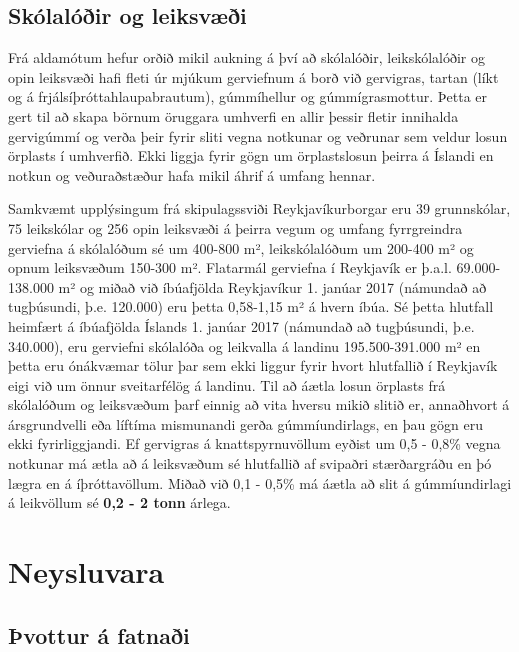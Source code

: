 \documentclass[icelandic,]{book}
\begin{document}
\hypertarget{skolaloir-og-leiksvi}{%
\subsection*{Skólalóðir og leiksvæði}\label{skolaloir-og-leiksvi}}

Frá aldamótum hefur orðið mikil aukning á því að skólalóðir, leikskólalóðir og opin leiksvæði hafi fleti úr mjúkum gerviefnum á borð við gervigras, tartan (líkt og á frjálsíþróttahlaupabrautum), gúmmíhellur og gúmmígrasmottur. Þetta er gert til að skapa börnum öruggara umhverfi en allir þessir fletir innihalda gervigúmmí og verða þeir fyrir sliti vegna notkunar og veðrunar sem veldur losun örplasts í umhverfið. Ekki liggja fyrir gögn um örplastslosun þeirra á Íslandi en notkun og veðuraðstæður hafa mikil áhrif á umfang hennar.

Samkvæmt upplýsingum frá skipulagssviði Reykjavíkurborgar eru 39 grunnskólar, 75 leikskólar og 256 opin leiksvæði á þeirra vegum og umfang fyrrgreindra gerviefna á skólalóðum sé um 400-800 m², leikskólalóðum um 200-400 m² og opnum leiksvæðum 150-300 m². Flatarmál gerviefna í Reykjavík er þ.a.l. 69.000-138.000 m² og miðað við íbúafjölda Reykjavíkur 1. janúar 2017 (námundað að tugþúsundi, þ.e. 120.000) eru þetta 0,58-1,15 m² á hvern íbúa. Sé þetta hlutfall heimfært á íbúafjölda Íslands 1. janúar 2017 (námundað að tugþúsundi, þ.e. 340.000), eru gerviefni skólalóða og leikvalla á landinu 195.500-391.000 m² en þetta eru ónákvæmar tölur þar sem ekki liggur fyrir hvort hlutfallið í Reykjavík eigi við um önnur sveitarfélög á landinu. Til að áætla losun örplasts frá skólalóðum og leiksvæðum þarf einnig að vita hversu mikið slitið er, annaðhvort á ársgrundvelli eða líftíma mismunandi gerða gúmmíundirlags, en þau gögn eru ekki fyrirliggjandi. Ef gervigras á knattspyrnuvöllum eyðist um 0,5 - 0,8\% vegna notkunar má ætla að á leiksvæðum sé hlutfallið af svipaðri stærðargráðu en þó lægra en á íþróttavöllum. Miðað við 0,1 - 0,5\% má áætla að slit á gúmmíundirlagi á leikvöllum sé \textbf{0,2 - 2 tonn} árlega.

\hypertarget{neysluvara}{%
\section*{Neysluvara}\label{neysluvara}}

\hypertarget{vottur-a-fatnai}{%
\subsection*{Þvottur á fatnaði}\label{vottur-a-fatnai}}
\end{document}
